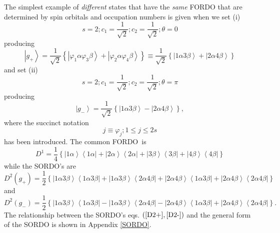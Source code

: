 \documentclass[aps,preprint]{revtex4}%
\begin{document}
The simplest example of \emph{different} states that have the \emph{same}
FORDO that are determined by spin orbitals and occupation numbers is given
when we set (i)
\begin{equation}
s=2;c_{1}=\frac{1}{\sqrt{2}};c_{2}=\frac{1}{\sqrt{2}};\theta=0
\end{equation}
producing%
\begin{equation}
\left\vert g_{+}\right\rangle =\frac{1}{\sqrt{2}}\left\{  \left\vert
\varphi_{1}\alpha\varphi_{3}\beta\right\rangle +\left\vert \varphi_{2}%
\alpha\varphi_{4}\beta\right\rangle \right\}  \equiv\frac{1}{\sqrt{2}}\left\{
\left\vert 1\alpha3\beta\right\rangle +\left\vert 2\alpha4\beta\right\rangle
\right\}  \label{ex1}%
\end{equation}
and set (ii)
\begin{equation}
s=2;c_{1}=\frac{1}{\sqrt{2}};c_{2}=\frac{1}{\sqrt{2}};\theta=\pi
\end{equation}
producing
\begin{equation}
\left\vert g_{-}\right\rangle =\frac{1}{\sqrt{2}}\left\{  \left\vert
1\alpha3\beta\right\rangle -\left\vert 2\alpha4\beta\right\rangle \right\}  ,
\label{ex2}%
\end{equation}
where the succinct notation
\begin{equation}
j\equiv\varphi_{j};1\leq j\leq2s
\end{equation}
has been introduced. The common FORDO\ is
\begin{equation}
D^{1}=\frac{1}{4}\left\{  \left\vert 1\alpha\right\rangle \left\langle
1\alpha\right\vert +\left\vert 2\alpha\right\rangle \left\langle
2\alpha\right\vert +\left\vert 3\beta\right\rangle \left\langle 3\beta
\right\vert +\left\vert 4\beta\right\rangle \left\langle 4\beta\right\vert
\right\}  \label{D1+-}%
\end{equation}
while the SORDO's are
\begin{equation}
D^{2}\left(  g_{+}\right)  =\frac{1}{2}\left\{  \left\vert 1\alpha
3\beta\right\rangle \left\langle 1\alpha3\beta\right\vert +\left\vert
1\alpha3\beta\right\rangle \left\langle 2\alpha4\beta\right\vert +\left\vert
2\alpha4\beta\right\rangle \left\langle 1\alpha3\beta\right\vert +\left\vert
2\alpha4\beta\right\rangle \left\langle 2\alpha4\beta\right\vert \right\}
\label{D2+}%
\end{equation}
and
\begin{equation}
D^{2}\left(  g_{-}\right)  =\frac{1}{2}\left\{  \left\vert 1\alpha
3\beta\right\rangle \left\langle 1\alpha3\beta\right\vert -\left\vert
1\alpha3\beta\right\rangle \left\langle 2\alpha4\beta\right\vert -\left\vert
2\alpha4\beta\right\rangle \left\langle 1\alpha3\beta\right\vert +\left\vert
2\alpha4\beta\right\rangle \left\langle 2\alpha4\beta\right\vert \right\}  .
\label{D2-}%
\end{equation}
The relationship between the SORDO's eqs. $\left(  \ref{D2+},\ref{D2-}\right)
$ and the general form of the SORDO is shown in Appendix \ref{SORDO}.
\end{document}
